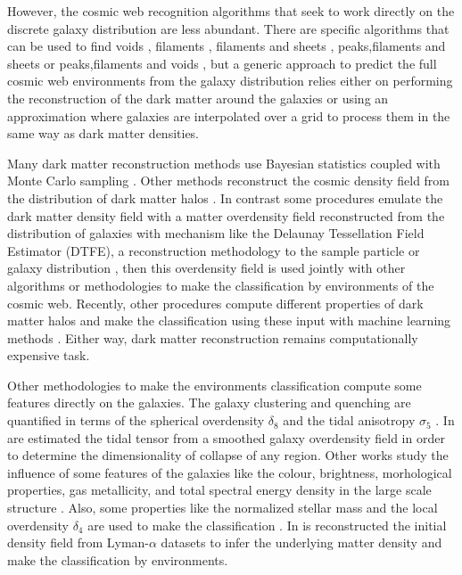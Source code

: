 \documentclass[usenatbib]{mnras}
\begin{document}
However, the cosmic web recognition algorithms that seek to work
directly on the discrete galaxy distribution are less abundant.
There are specific algorithms that can be used to find voids \citep{Platen2007,Neyrinck2008,Ravoux2020}, filaments \citep{Novikov2003,Zhang2009,Sousbie2010,Chen2015,Luber2019,Malavasi2020}, filaments and sheets \citep{Zhang2009}, peaks,filaments and sheets \citep{Aragon-Calvo2019} or peaks,filaments and voids \citep{Buncher2019}, 
but a generic approach to predict the full cosmic web environments 
from the galaxy distribution relies either on performing 
the reconstruction of the dark matter around the galaxies
or using an approximation where galaxies are interpolated over a 
grid to process them in the same way as dark matter densities.

Many dark matter reconstruction methods use Bayesian statistics
coupled with Monte Carlo sampling
\citep{Jasche2010,Jasche2013a,Bos2014,LeclercqJasche2015,Horowitz2019,Burchett2020}. Other methods reconstruct the cosmic density field from the distribution of dark matter halos \citep{Wang2009}. In contrast some procedures emulate the dark matter density field with a matter 
overdensity field reconstructed from the distribution of galaxies with 
mechanism like the Delaunay Tessellation Field Estimator (DTFE),
a reconstruction methodology to the sample particle or galaxy 
distribution  \citep{Schaap2007,Platen2011,Aragon-Calvo2007,Aragon-Calvo2010,Cautun2013,Cautun2014}, 
then this overdensity field is used jointly with other algorithms or methodologies to make the classification by environments of the cosmic web. Recently, other procedures compute different properties of dark matter halos and make the classification using these input with machine learning methods \citep{Hui2018}. 
Either way, dark matter reconstruction remains computationally expensive task. 

Other methodologies to make the environments classification compute some features directly on the galaxies. The galaxy clustering and quenching are quantified in terms of the spherical overdensity $\delta_8$ and the tidal anisotropy $\sigma_5$ \citep{Shadab2019}. In \citep{Eardley2015} are estimated the  tidal  tensor  from  a smoothed galaxy overdensity field in order to determine the dimensionality of collapse of any region. Other works study the influence of some features of the galaxies like the colour, brightness, morhological properties, gas metallicity, and total spectral energy density in the large scale structure \citep{Alpaslan2016}. Also, some properties like the normalized stellar mass and the local overdensity $\delta_4$ are used to make the classification \citep{Tojeiro2017}. In \citep{Horowitz2019} is reconstructed the initial density field from Lyman-$\alpha$ datasets to infer the underlying matter density and make the classification by environments.
\end{document}
